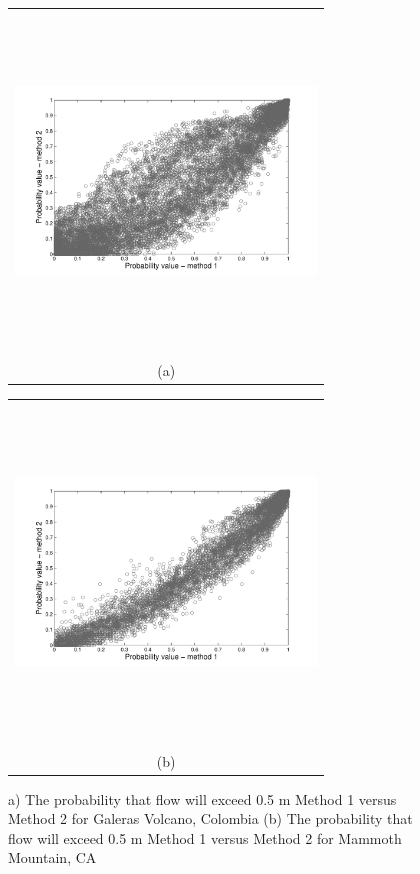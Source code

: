 \documentclass[12pt]{article}
\newcommand{\Pic}[2][0.85]{\begin{center}\texttt{[image: \#2]}
 \end{center} }
\begin{document}
\begin{figure}[H]
    \begin{minipage}[b]{0.6\textwidth}
        \begin{tabular}{c}
       \includegraphics[width=8cm,height=9cm,keepaspectratio]{cloud_galeras.pdf}\\
        (a)
        \end{tabular}
    \end{minipage}
    \begin{minipage}{0.6\textwidth}
        \begin{tabular}{c}
	\includegraphics[width=8cm,height=9cm,keepaspectratio]{cloud_mammoth.pdf}\\
        (b)
        \end{tabular}
    \end{minipage} 
    \caption{a) The probability that flow will exceed 0.5 m Method 1
      versus Method 2 for Galeras Volcano, Colombia (b) The
      probability that flow will exceed 0.5 m Method 1 versus Method 2
      for Mammoth Mountain, CA }
\label{fig5}  
\end{figure}
\end{document}
